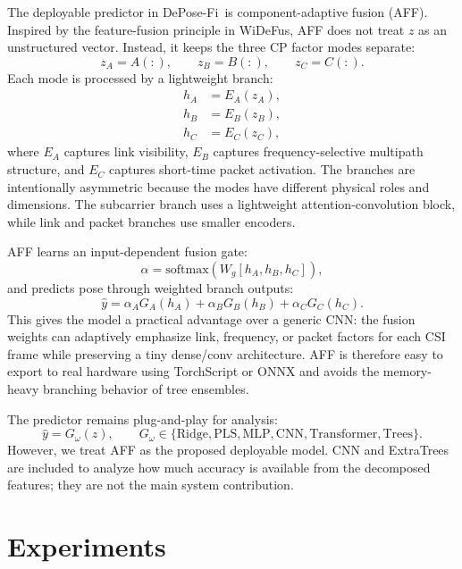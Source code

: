 \documentclass[letterpaper]{article}
\newcommand{\method}{DePose-Fi}
\begin{document}
The deployable predictor in \method\ is component-adaptive fusion (AFF). Inspired by the feature-fusion principle in WiDeFus, AFF does not treat $z$ as an unstructured vector. Instead, it keeps the three CP factor modes separate:
\begin{equation}
z_A=A(:),\qquad z_B=B(:),\qquad z_C=C(:).
\end{equation}
Each mode is processed by a lightweight branch:
\begin{align}
h_A &= E_A(z_A),\\
h_B &= E_B(z_B),\\
h_C &= E_C(z_C),
\end{align}
where $E_A$ captures link visibility, $E_B$ captures frequency-selective multipath structure, and $E_C$ captures short-time packet activation. The branches are intentionally asymmetric because the modes have different physical roles and dimensions. The subcarrier branch uses a lightweight attention-convolution block, while link and packet branches use smaller encoders.

AFF learns an input-dependent fusion gate:
\begin{equation}
\alpha=\mathrm{softmax}\left(W_g[h_A,h_B,h_C]\right),
\end{equation}
and predicts pose through weighted branch outputs:
\begin{equation}
\hat{y}=
\alpha_A G_A(h_A)+
\alpha_B G_B(h_B)+
\alpha_C G_C(h_C).
\label{eq:aff}
\end{equation}
This gives the model a practical advantage over a generic CNN: the fusion weights can adaptively emphasize link, frequency, or packet factors for each CSI frame while preserving a tiny dense/conv architecture. AFF is therefore easy to export to real hardware using TorchScript or ONNX and avoids the memory-heavy branching behavior of tree ensembles.

The predictor remains plug-and-play for analysis:
\begin{equation}
\hat{y}=G_\omega(z),\qquad
G_\omega\in\{\text{Ridge},\text{PLS},\text{MLP},\text{CNN},\text{Transformer},\text{Trees}\}.
\end{equation}
However, we treat AFF as the proposed deployable model. CNN and ExtraTrees are included to analyze how much accuracy is available from the decomposed features; they are not the main system contribution.

\section{Experiments}
\end{document}
